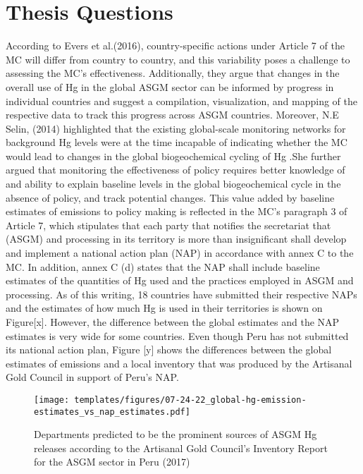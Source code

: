 \section{Thesis Questions}
According to Evers et al.(2016), country-specific actions under Article 7 of the MC will differ from country to country, and this variability poses a challenge to assessing the MC's effectiveness. Additionally, they argue that changes in the overall use of Hg in the global ASGM sector can be informed by progress in individual countries and suggest a compilation, visualization, and mapping of the respective data to track this progress across ASGM countries. Moreover, N.E Selin, (2014) highlighted that the existing global-scale monitoring networks for background Hg levels were at the time incapable of indicating whether the MC would lead to changes in the global biogeochemical cycling of Hg .She further argued that monitoring the effectiveness of policy requires better knowledge of and ability to explain baseline levels in the global biogeochemical cycle in the absence of policy, and track potential changes. This value added by baseline estimates of emissions to policy making is reflected in the MC's paragraph 3 of Article 7, which stipulates that each party that notifies the secretariat that (ASGM) and processing in its territory is more than insignificant shall develop and implement a national action plan (NAP) in accordance with annex C to the MC. In addition, annex C (d) states that the NAP shall include baseline estimates of the quantities of Hg used and the practices employed in ASGM and processing. As of this writing, 18 countries have submitted their respective NAPs and the estimates of how much Hg is used in their territories is shown on Figure[x]. However, the difference between the global estimates and the NAP estimates is very wide for some countries. Even though Peru has not submitted its national action plan, Figure [y] shows the differences between the global estimates of emissions and a local inventory that was produced by the Artisanal Gold Council in support of Peru's NAP. 

\begin{figure}[H]
  \texttt{[image: templates/figures/07-24-22\_global-hg-emission-estimates\_vs\_nap\_estimates.pdf]}
  \centering
  \caption{Departments predicted to be the prominent sources of ASGM Hg releases according to the Artisanal Gold Council's  Inventory Report for the ASGM sector in Peru (2017) }
  \label{fig:PeruCS}
\end{figure}
\FloatBarrier

